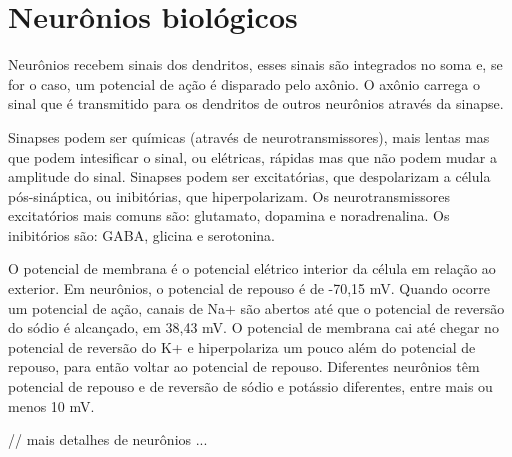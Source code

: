 \section{Neurônios biológicos}

Neurônios recebem sinais dos dendritos, esses sinais são integrados no soma e, se for o caso, um potencial de ação é disparado
pelo axônio. O axônio carrega o sinal que é transmitido para os dendritos de outros neurônios através da sinapse.

Sinapses podem ser químicas (através de neurotransmissores), mais lentas mas que podem intesificar o sinal, ou elétricas, rápidas
mas que não podem mudar a amplitude do sinal. Sinapses podem ser excitatórias, que despolarizam a célula pós-sináptica, ou
inibitórias, que hiperpolarizam. Os neurotransmissores excitatórios mais comuns são: glutamato, dopamina e noradrenalina. Os
inibitórios são: GABA, glicina e serotonina.

O potencial de membrana é o potencial elétrico interior da célula em relação ao exterior. Em neurônios, o potencial de repouso é
de -70,15 mV. Quando ocorre um potencial de ação, canais de Na+ são abertos até que o potencial de reversão do sódio é alcançado,
em 38,43 mV. O potencial de membrana cai até chegar no potencial de reversão do K+ e hiperpolariza um pouco além do potencial de
repouso, para então voltar ao potencial de repouso. Diferentes neurônios têm potencial de repouso e de reversão de sódio e
potássio diferentes, entre mais ou menos 10 mV.

// mais detalhes de neurônios
{...}